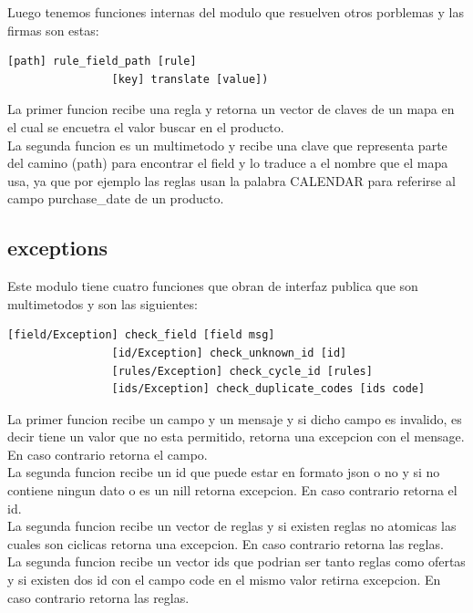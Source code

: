 \documentclass[a4paper, 12pt]{article}
\begin{document}
			Luego tenemos funciones internas del modulo que resuelven otros porblemas y las firmas son estas:
			\begin{lstlisting}[frame=tb, caption=firmas de las funciones privadas, label=zebra, tabsize=1]
				[path] rule_field_path [rule]
				[key] translate [value])
			\end{lstlisting}
			La primer funcion recibe una regla y retorna un vector de claves de un mapa en el cual se encuetra el valor buscar en 				el producto.\\
			La segunda funcion es un multimetodo y recibe una clave que representa parte del camino (path) para encontrar el field 				y lo traduce a el nombre que el mapa usa, ya que por ejemplo las reglas usan la palabra CALENDAR para referirse al 				campo purchase\_date de un producto.		

		\newpage
		\subsection{exceptions}
			Este modulo tiene cuatro funciones que obran de interfaz publica que son multimetodos y son las siguientes:
			\begin{lstlisting}[frame=tb, caption=firmas de la interfaz publica, label=zebra, tabsize=1]
				[field/Exception] check_field [field msg]
				[id/Exception] check_unknown_id [id]
				[rules/Exception] check_cycle_id [rules]
				[ids/Exception] check_duplicate_codes [ids code]
			\end{lstlisting}
			La primer funcion recibe un campo y un mensaje y si dicho campo es invalido, es decir tiene un valor que no esta 				permitido, retorna una excepcion con el mensage. En caso contrario retorna el campo.\\
			La segunda funcion recibe un id que puede estar en formato json o no y si no contiene ningun dato o es un nill retorna 				excepcion. En caso contrario retorna el id.\\
			La segunda funcion recibe un vector de reglas y si existen reglas no atomicas las cuales son ciclicas retorna una 				excepcion. En caso contrario retorna las reglas.\\
			La segunda funcion recibe un vector ids que podrian ser tanto reglas como ofertas y si existen dos id con el campo code 			en el mismo valor retirna excepcion. En caso contrario retorna las reglas.\\

		\newpage
\end{document}
